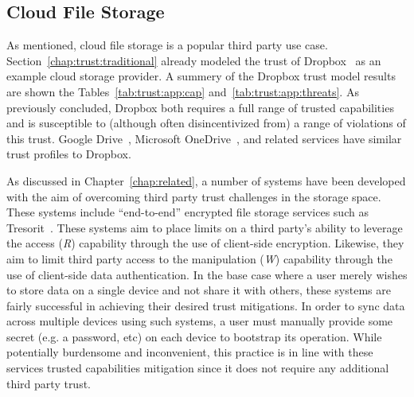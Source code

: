 \subsection{Cloud File Storage}

As mentioned, cloud file storage is a popular third party use
case. Section~\ref{chap:trust:traditional} already modeled the trust
of Dropbox~\cite{dropbox} as an example cloud storage provider. A
summery of the Dropbox trust model results are shown the
Tables~\ref{tab:trust:app:cap} and~\ref{tab:trust:app:threats}. As
previously concluded, Dropbox both requires a full range of trusted
capabilities and is susceptible to (although often disincentivized
from) a range of violations of this trust. Google
Drive~\cite{google-drive}, Microsoft
OneDrive~\cite{microsoft-onedrive}, and related services have similar
trust profiles to Dropbox.

As discussed in Chapter~\ref{chap:related}, a number of systems have
been developed with the aim of overcoming third party trust challenges
in the storage space. These systems include ``end-to-end'' encrypted
file storage services such as Tresorit~\cite{tresorit}. These systems
aim to place limits on a third party's ability to leverage the access
(\emph{R}) capability through the use of client-side
encryption. Likewise, they aim to limit third party access to the
manipulation (\emph{W}) capability through the use of client-side data
authentication. In the base case where a user merely wishes to store
data on a single device and not share it with others, these systems
are fairly successful in achieving their desired trust mitigations. In
order to sync data across multiple devices using such systems, a user
must manually provide some secret (e.g. a password, etc) on each
device to bootstrap its operation. While potentially burdensome and
inconvenient, this practice is in line with these services trusted
capabilities mitigation since it does not require any additional third
party trust.

